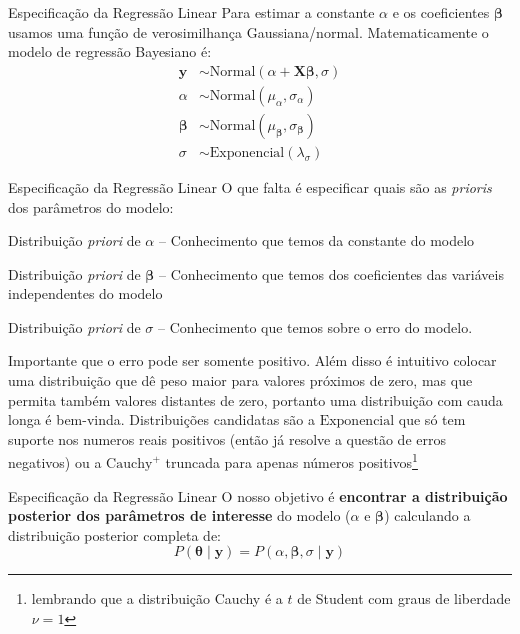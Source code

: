 \begin{frame}{Especificação da Regressão Linear}
	Para estimar a constante $\alpha$ e os coeficientes $\boldsymbol{\beta}$ usamos uma função de verosimilhança
	Gaussiana/normal. Matematicamente o modelo de regressão Bayesiano é:
	$$
		\begin{aligned}
			\boldsymbol{y}     & \sim \text{Normal}\left( \alpha +  \mathbf{X} \boldsymbol{\beta}, \sigma \right) \\
			\alpha             & \sim \text{Normal}(\mu_\alpha, \sigma_\alpha)                                    \\
			\boldsymbol{\beta} & \sim \text{Normal}(\mu_{\boldsymbol{\beta}}, \sigma_{\boldsymbol{\beta}})        \\
			\sigma             & \sim \text{Exponencial}(\lambda_\sigma)
		\end{aligned}
	$$
\end{frame}

\begin{frame}{Especificação da Regressão Linear}
	O que falta é especificar quais são as \textit{prioris} dos parâmetros do modelo:
	\begin{vfilleditems}
		\item Distribuição \textit{priori} de $\alpha$ -- Conhecimento que temos da constante do modelo
		\item Distribuição \textit{priori} de $\boldsymbol{\beta}$ -- Conhecimento que temos dos coeficientes das variáveis independentes do modelo
		\item Distribuição \textit{priori} de $\sigma$ -- Conhecimento que temos sobre o erro do modelo.
	\end{vfilleditems}
	\vfill
	\footnotesize
	Importante que o erro pode ser somente positivo. Além disso é intuitivo colocar uma
	distribuição que dê peso maior para valores próximos de zero, mas que permita
	também valores distantes de zero, portanto uma distribuição com cauda longa é
	bem-vinda. Distribuições candidatas são a $\text{Exponencial}$ que só tem
	suporte nos numeros reais positivos (então já resolve a questão de erros negativos)
	ou a $\text{Cauchy}^+$ truncada para apenas números positivos\footnote{lembrando
		que a distribuição Cauchy é a $t$ de Student com graus de liberdade $\nu = 1$}
\end{frame}

\begin{frame}{Especificação da Regressão Linear}
	O nosso objetivo é \textbf{encontrar a distribuição posterior dos parâmetros de
		interesse} do modelo ($\alpha$ e $\boldsymbol{\beta}$) calculando a distribuição
	posterior completa de:
	$$
		P(\boldsymbol{\theta} \mid \boldsymbol{y}) = P(\alpha, \boldsymbol{\beta}, \sigma \mid \boldsymbol{y})
	$$
\end{frame}

